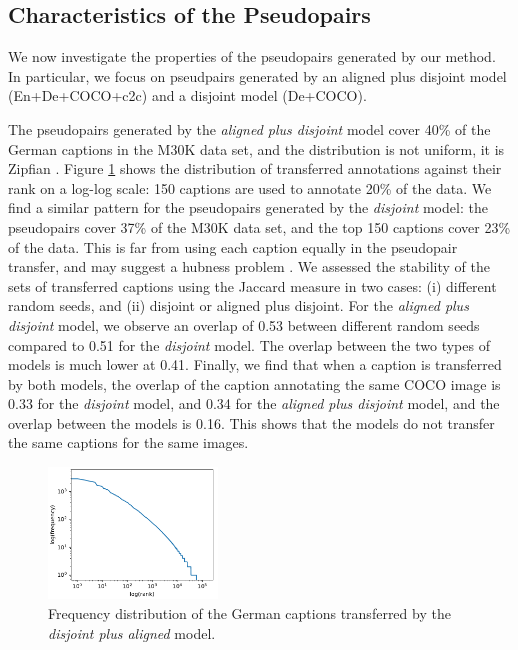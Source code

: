 \subsection{Characteristics of the Pseudopairs}


We now investigate the properties of the pseudopairs generated by our method. In particular, we focus on pseudpairs generated by an aligned plus disjoint model (En+De+COCO+c2c) and a disjoint model (De+COCO).

The pseudopairs generated by the \textit{aligned plus disjoint} model cover 40\% of the German captions in the M30K data set, and the distribution is not uniform, it is Zipfian \citep{zipf1949human}. Figure \ref{fig:annotation_freq} shows the distribution of transferred annotations against their rank on a log-log scale: 150 captions are used to annotate 20\% of the data. We find a similar pattern for the pseudopairs generated by the \textit{disjoint} model: the pseudopairs cover 37\% of the M30K data set, and the top 150 captions cover 23\% of the data. This is far from using each caption equally in the pseudopair transfer, and may suggest a hubness problem \citep{dinu2014improving}. We assessed the stability of the sets of transferred captions using the Jaccard measure in two cases: (i) different random seeds, and (ii) disjoint or aligned plus disjoint. For the \emph{aligned plus disjoint} model, we observe an overlap of 0.53 between different random seeds compared to 0.51 for the \emph{disjoint} model. The overlap between the two types of models is much lower at 0.41. Finally, we find that when a caption is transferred by both models, the overlap of the caption annotating the same COCO image is 0.33 for the \emph{disjoint} model, and 0.34 for the \emph{aligned plus disjoint} model, and the overlap between the models is 0.16. This shows that the models do not transfer the same captions for the same images.

\begin{figure}[t]
    \centering
    \includegraphics[width=0.4\textwidth]{chapters/EMNLP/assets/annotation_freq.pdf}
    \caption{Frequency distribution of the German captions transferred by the \textit{disjoint plus aligned} model.}
    \label{fig:annotation_freq}
\end{figure}


